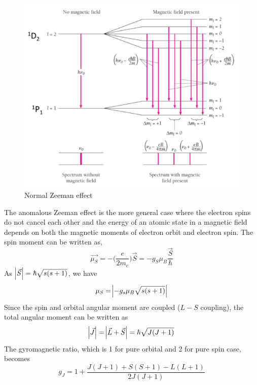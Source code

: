 \documentclass[%
 reprint,
nofootinbib,
 amsmath,amssymb,
 aps,
floatfix,
]{revtex4-2}
\begin{document}
    \begin{figure}
        \centering
        \includegraphics[scale = 0.62]{Figures/normalzeeman.png}
        \caption{Normal Zeeman effect}
        \label{fig:normalzeeman}
    \end{figure}
    \par
    The anomalous Zeeman effect is the more general case where the electron spins do not cancel each other and the energy of an atomic state in a magnetic field depends on both the magnetic moments of electron orbit and electron spin. The spin moment can be written as,
    \begin{equation}
        \Vec{\mu_S} = - \Big( \dfrac{e}{2 m_e} \Big) \Vec{S} = -g_S \mu_B \dfrac{\Vec{S}}{\hbar}
    \end{equation}
    As $\abs{\Vec{S}} = \hbar \sqrt{s(s+1)}$, we have
    \begin{equation}
        \mu_S = \abs{-g_s \mu_B \sqrt{s(s+1)}}
    \end{equation}
    Since the spin and orbital angular moment are coupled ($L-S$ coupling), the total angular moment can be written as
    \begin{equation}
        \abs{\Vec{J}} = \abs{\Vec{L} + \Vec{S}} = \hbar \sqrt{J(J+1)}
    \end{equation}
    The gyromagnetic ratio, which is 1 for pure orbital and 2 for pure spin case, becomes
    \begin{equation}
        g_J = 1 + \dfrac{J(J+1) + S(S+1) - L(L+1)}{2J(J+1)}
    \end{equation}
\end{document}
